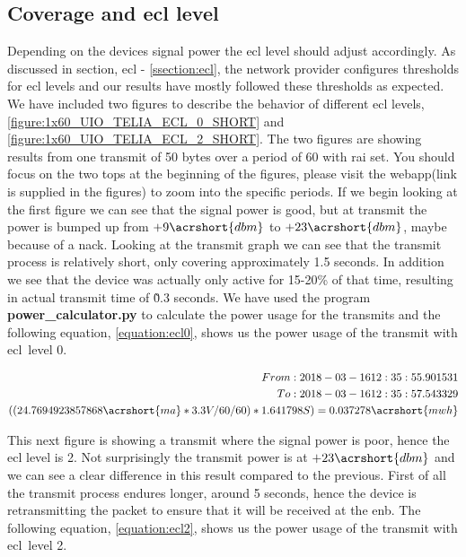 \documentclass[USenglish]{ifimaster}  %
\begin{document}
\subsection{Coverage and \acrshort{ecl} level} \label{ssection:ecltest}
Depending on the devices signal power the \acrshort{ecl} level should adjust accordingly. As discussed in section, \acrshort{ecl} - \vref{ssection:ecl}, the network provider configures thresholds for \acrshort{ecl} levels and our results have mostly followed these thresholds as expected. We have included two figures to describe the behavior of different \acrshort{ecl} levels, \vref{figure:1x60_UIO_TELIA_ECL_0_SHORT} and \vref{figure:1x60_UIO_TELIA_ECL_2_SHORT}.
The two figures are showing results from one transmit of 50 bytes over a period of 60 with \acrshort{rai} set. You should focus on the two tops at the beginning of the figures, please visit the webapp(link is supplied in the figures) to zoom into the specific periods. If we begin looking at the first figure we can see that the signal power is good, but at transmit the power is bumped up from ${+9 \acrshort{dbm}}$ to ${+23 \acrshort{dbm}}$, maybe because of a \acrshort{nack}. Looking at the transmit graph we can see that the transmit process is relatively short, only covering approximately 1.5 seconds.
In addition we see that the device was actually only active for 15-20\% of that time, resulting in actual transmit time of \~0.3 seconds. We have used the program \textbf{power\_calculator.py} to calculate the power usage for the transmits and the following equation, \vref{equation:ecl0}, shows us the power usage of the transmit with \acrshort{ecl} level 0.

\begin{equation*} \label{equation:ecl0}
\begin{aligned}
From: 2018-03-16 12:35:55.901531 \\
To: 2018-03-16 12:35:57.543329 \\
((24.7694923857868\acrshort{ma} * 3.3V / 60 / 60 ) * 1.641798S) = 0.037278\acrshort{mwh} \\
\end{aligned}
\end{equation*}

This next figure is showing a transmit where the signal power is poor, hence the \acrshort{ecl} level is 2. Not surprisingly the transmit power is at ${+23 \acrshort{dbm}}$ and we can see a clear difference in this result compared to the previous. First of all the transmit process endures longer, around 5 seconds, hence the device is retransmitting the packet to ensure that it will be received at the \acrshort{enb}. The following equation, \vref{equation:ecl2}, shows us the power usage of the transmit with \acrshort{ecl} level 2.
\end{document}
